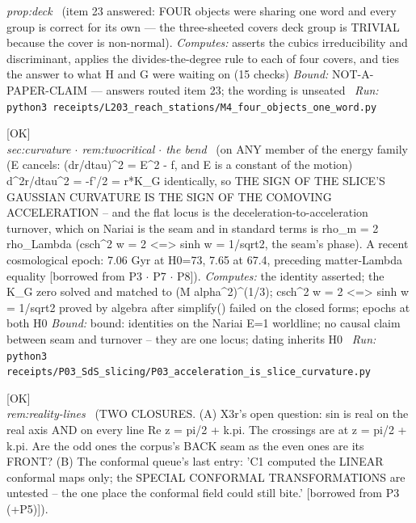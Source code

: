 \begin{description}
\textit{prop:deck} \ (item 23 answered: FOUR objects were sharing one word and every group is correct for its own --- the three-sheeted covers deck group is TRIVIAL because the cover is non-normal). 
\emph{Computes:} asserts the cubics irreducibility and discriminant, applies the divides-the-degree rule to each of four covers, and ties the answer to what H and G were waiting on (15 checks)
 \emph{Bound:} NOT-A-PAPER-CLAIM --- answers routed item 23; the wording is unseated
\ \emph{Run:} \texttt{python3 receipts/L203\_reach\_stations/M4\_four\_objects\_one\_word.py}
\item[\rcptlabel{P03_acceleration_is_slice_curvature}{P3R12}\textbf{P3R12}\quad\texttt{P03\_acceleration\_is\_slice\_curvature}]\hfill\textsf{[OK]}\\
\textit{sec:curvature \ensuremath{\cdot} rem:twocritical \ensuremath{\cdot} the bend} \ (on ANY member of the energy family (E cancels: (dr/dtau)\textasciicircum{}2 = E\textasciicircum{}2 - f, and E is a constant of the motion) d\textasciicircum{}2r/dtau\textasciicircum{}2 = -f'/2 = r*K\_G identically, so THE SIGN OF THE SLICE'S GAUSSIAN CURVATURE IS THE SIGN OF THE COMOVING ACCELERATION -- and the flat locus is the deceleration-to-acceleration turnover, which on Nariai is the seam and in standard terms is rho\_m = 2 rho\_Lambda (csch\textasciicircum{}2 w = 2 <=> sinh w = 1/sqrt2, the seam's phase). A recent cosmological epoch: 7.06 Gyr at H0=73, 7.65 at 67.4, preceding matter-Lambda equality [borrowed from P3 \ensuremath{\cdot} P7 \ensuremath{\cdot} P8]). 
\emph{Computes:} the identity asserted; the K\_G zero solved and matched to (M alpha\textasciicircum{}2)\textasciicircum{}(1/3); csch\textasciicircum{}2 w = 2 <=> sinh w = 1/sqrt2 proved by algebra after simplify() failed on the closed forms; epochs at both H0
 \emph{Bound:} bound: identities on the Nariai E=1 worldline; no causal claim between seam and turnover -- they are one locus; dating inherits H0
\ \emph{Run:} \texttt{python3 receipts/P03\_SdS\_slicing/P03\_acceleration\_is\_slice\_curvature.py}
\item[\rcptlabel{C5_sct_already_linear}{P3R28}\textbf{P3R28}\quad\texttt{C5\_sct\_already\_linear}]\hfill\textsf{[OK]}\\
\textit{rem:reality-lines} \ (TWO CLOSURES. (A) X3r's open question: sin is real on the real axis AND on every line Re z = pi/2 + k.pi. The crossings are at z = pi/2 + k.pi. Are the odd ones the corpus's BACK seam as the even ones are its FRONT? (B) The conformal queue's last entry: 'C1 computed the LINEAR conformal maps only; the SPECIAL CONFORMAL TRANSFORMATIONS are untested -- the one place the conformal field could still bite.' [borrowed from P3 (+P5)]). 

\end{description}
